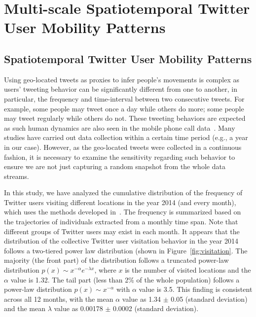 \documentclass[ijgi,article,accept,moreauthors,pdftex,10pt,a4paper]{mdpi}
\theoremstyle{mdpi}
\newcounter{ex}
\newcounter{re}
\theoremstyle{mdpidefinition}
\begin{document}
\section{Multi-scale Spatiotemporal Twitter User Mobility Patterns}
\subsection{Spatiotemporal Twitter User Mobility Patterns}
Using geo-located tweets as proxies to infer people's movements is complex as users' tweeting behavior can be significantly different from one to another, in particular, the frequency and time-interval between two consecutive tweets.
For example, some people may tweet once a day while others do more; some people may tweet regularly while others do not.  
These tweeting behaviors are expected as such human dynamics are also seen in the mobile phone call data~\cite{gonzalez2008understanding}. 
Many studies have carried out data collection within a certain time period (e.g., a year in our case).
However, as the geo-located tweets were collected in a continuous fashion, it is necessary to examine the sensitivity regarding such behavior to ensure we are not just capturing a random snapshot from the whole data streams. 

In this study, we have analyzed the cumulative distribution of the frequency of Twitter users visiting different locations in the year 2014 (and every month), which uses the methods developed in~\cite{clauset2009power}. 
The frequency is summarized based on the trajectories of individuals extracted from a monthly time span.
Note that different groups of Twitter users may exist in each month. 
It appears that the distribution of the collective Twitter user visitation behavior in the year 2014 follows a two-tiered power law distribution (shown in Figure~\ref{fig:visitation}.
The majority (the front part) of the distribution follows a truncated power-law distribution $p(x)\sim x^{-\alpha}e^{-\lambda x}$, where $x$ is the number of visited locations and the $\alpha$ value is 1.32.
The tail part (less than 2$\%$ of the whole population) follows a power-law distribution $p(x)\sim x^{-\alpha}$ with $\alpha$ value is 3.5.
This finding is consistent across all 12 months, with the mean $\alpha$ value as 1.34 $ \pm$  0.05 (standard deviation) and the mean $\lambda$ value as 0.00178 $ \pm$  0.0002 (standard deviation).
\end{document}
